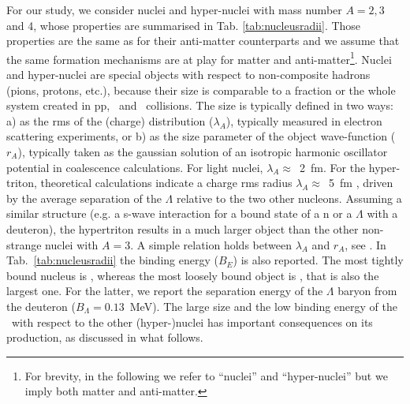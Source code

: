 \documentclass[a4paper,11pt]{article}
\begin{document}
For our study, we consider nuclei and hyper-nuclei with mass number $A = 2, 3$ and 4, whose properties are summarised in Tab. \ref{tab:nucleusradii}. Those properties are the same as for their anti-matter counterparts and we assume that the same formation mechanisms are at play for matter and anti-matter\footnote{For brevity, in the following we refer to ``nuclei'' and ``hyper-nuclei'' but we imply both matter and anti-matter.}.
Nuclei and hyper-nuclei are special objects with respect to non-composite hadrons (pions, protons, etc.), because their size is comparable to a fraction or the whole system created in pp, \pPb~and \PbPb~collisions.
The size is typically defined in two ways: a) as the rms of the (charge) distribution ($\lambda_A$), typically measured in electron scattering experiments, or b) as the size parameter of the object wave-function ($r_A$), typically taken as the gaussian solution of an isotropic harmonic oscillator potential in coalescence calculations. 
For light nuclei, $\lambda_A\approx$~2~fm.  For the hyper-triton, theoretical calculations indicate a charge rms radius $\lambda_A\approx$~5~fm \cite{Nemura:1999qp}, driven by the average separation of the $\Lambda$ relative to the two other nucleons. 
Assuming a similar structure (e.g. a s-wave interaction for a bound state of a n or a $\Lambda$ with a
deuteron), the hypertriton results in a much larger object than the other non-strange nuclei with $A=3$.
A simple relation holds between $\lambda_A$ and $r_A$, see \cite{Bellini:2018epz}. 
In Tab.~\ref{tab:nucleusradii} the binding energy ($B_E$) is also reported. The most tightly bound nucleus is \hefour, whereas the most loosely bound object is \hthreelambda, that is also the largest one. For the latter, we report the separation energy of the $\Lambda$ baryon from the deuteron ($B_\Lambda=0.13$~MeV). 
The large size and the low binding energy of the \hthreelambda~with respect to the other (hyper-)nuclei has important consequences on its production, as discussed in what follows.
\end{document}
